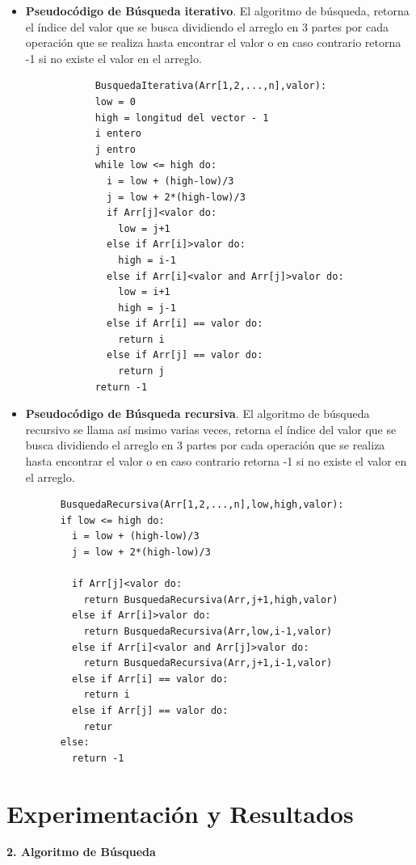 \documentclass[12pt,twoside]{article}
\begin{document}
\begin{itemize}
\item \textbf{Pseudocódigo de Búsqueda iterativo}.
El algoritmo de búsqueda, retorna el índice del valor que se busca dividiendo el arreglo en 3 partes por cada operación
que se realiza hasta encontrar el valor o en caso contrario retorna -1 si no existe el valor en el arreglo.
\begin{center}
\begin{verbatim}
            BusquedaIterativa(Arr[1,2,...,n],valor):
            low = 0
            high = longitud del vector - 1
            i entero 
            j entro
            while low <= high do:
              i = low + (high-low)/3
              j = low + 2*(high-low)/3
              if Arr[j]<valor do:
                low = j+1
              else if Arr[i]>valor do:
                high = i-1
              else if Arr[i]<valor and Arr[j]>valor do:
                low = i+1
                high = j-1
              else if Arr[i] == valor do:
                return i
              else if Arr[j] == valor do:
                return j
            return -1
\end{verbatim}
\end{center}
\item \textbf{Pseudocódigo de Búsqueda recursiva}.
El algoritmo de búsqueda recursivo se llama así msimo varias veces, retorna el índice del valor que se busca dividiendo el arreglo en 3 partes por cada operación
que se realiza hasta encontrar el valor o en caso contrario retorna -1 si no existe el valor en el arreglo.
\begin{center}
\begin{verbatim}
      BusquedaRecursiva(Arr[1,2,...,n],low,high,valor):
      if low <= high do:
        i = low + (high-low)/3
        j = low + 2*(high-low)/3
         
        if Arr[j]<valor do:
          return BusquedaRecursiva(Arr,j+1,high,valor)
        else if Arr[i]>valor do:
          return BusquedaRecursiva(Arr,low,i-1,valor)
        else if Arr[i]<valor and Arr[j]>valor do:
          return BusquedaRecursiva(Arr,j+1,i-1,valor)
        else if Arr[i] == valor do:
          return i
        else if Arr[j] == valor do:
          retur
      else:
        return -1
\end{verbatim}
\end{center}

\end{itemize}
\newpage
\section{Experimentación y Resultados}
\textbf{2. Algoritmo de Búsqueda}
\par
\end{document}

